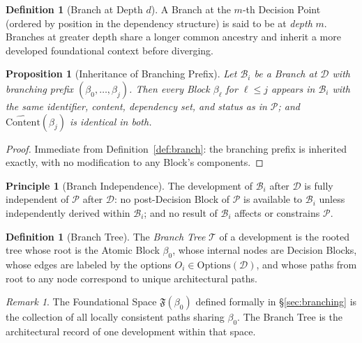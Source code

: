 \documentclass[12pt, a4paper]{article}
\theoremstyle{plain}
\newtheorem{proposition}[theorem]{Proposition}
\theoremstyle{definition}
\newtheorem{definition}[theorem]{Definition}
\newtheorem{principle}[theorem]{Principle}
\theoremstyle{remark}
\newtheorem{remark}[theorem]{Remark}
\newcommand{\FS}[1]{\mathfrak{F}(#1)}
\newcommand{\CC}[1]{\widehat{\mathrm{Content}}(#1)}
\begin{document}
\begin{definition}[Branch at Depth $d$]
\label{def:branch-depth}
A Branch at the $m$-th Decision Point (ordered by position in
the dependency structure) is said to be at \emph{depth} $m$.
Branches at greater depth share a longer common ancestry and
inherit a more developed foundational context before diverging.
\end{definition}

\begin{proposition}[Inheritance of Branching Prefix]
\label{prop:inheritance}
Let $\mathcal{B}_i$ be a Branch at $\mathcal{D}$ with branching
prefix $(\beta_0,\ldots,\beta_j)$. Then every Block $\beta_\ell$
for $\ell \leq j$ appears in $\mathcal{B}_i$ with the same
identifier, content, dependency set, and status as in
$\mathcal{P}$; and $\CC{\beta_j}$ is identical in both.
\end{proposition}

\begin{proof}
Immediate from Definition~\ref{def:branch}: the branching prefix
is inherited exactly, with no modification to any Block's
components.
\end{proof}

\begin{principle}[Branch Independence]
\label{prin:independence}
The development of $\mathcal{B}_i$ after $\mathcal{D}$ is fully
independent of $\mathcal{P}$ after $\mathcal{D}$: no post-Decision
Block of $\mathcal{P}$ is available to $\mathcal{B}_i$ unless
independently derived within $\mathcal{B}_i$; and no result of
$\mathcal{B}_i$ affects or constrains $\mathcal{P}$.
\end{principle}

\begin{definition}[Branch Tree]
\label{def:branch-tree}
The \emph{Branch Tree} $\mathcal{T}$ of a development is the
rooted tree whose root is the Atomic Block $\beta_0$, whose internal
nodes are Decision Blocks, whose edges are labeled by the options
$O_i \in \mathrm{Options}(\mathcal{D})$, and whose paths from root to
any node correspond to unique architectural paths.
\end{definition}

\begin{remark}
The Foundational Space $\FS{\beta_0}$ defined formally in
\S\ref{sec:branching} is the collection of all locally consistent
paths sharing $\beta_0$. The Branch Tree is the architectural
record of one development within that space.
\end{remark}
\end{document}

